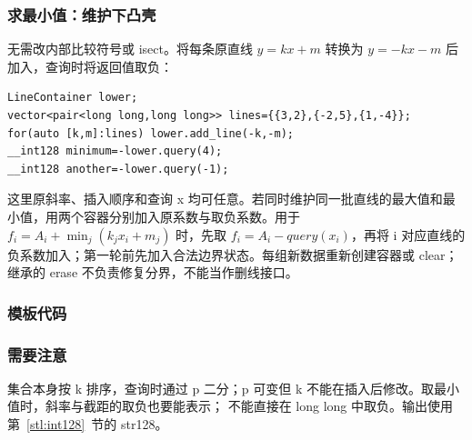 \subsubsection*{求最小值：维护下凸壳}
无需改内部比较符号或 isect。将每条原直线 $y=kx+m$ 转换为 $y=-kx-m$ 后加入，查询时将返回值取负：
\begin{lstlisting}[style=mtycpp,numbers=none]
LineContainer lower;
vector<pair<long long,long long>> lines={{3,2},{-2,5},{1,-4}};
for(auto [k,m]:lines) lower.add_line(-k,-m);
__int128 minimum=-lower.query(4);
__int128 another=-lower.query(-1);
\end{lstlisting}
这里原斜率、插入顺序和查询 x 均可任意。若同时维护同一批直线的最大值和最小值，用两个容器分别加入原系数与取负系数。用于 $f_i=A_i+\min_j(k_jx_i+m_j)$ 时，先取 $f_i=A_i-query(x_i)$，再将 i 对应直线的负系数加入；第一轮前先加入合法边界状态。每组新数据重新创建容器或 clear；继承的 erase 不负责修复分界，不能当作删线接口。
\subsubsection*{模板代码}
\subsubsection*{需要注意}
集合本身按 k 排序，查询时通过 p 二分；p 可变但 k 不能在插入后修改。取最小值时，斜率与截距的取负也要能表示； 不能直接在 long long 中取负。输出使用第~\ref{stl:int128}~节的 str128。
